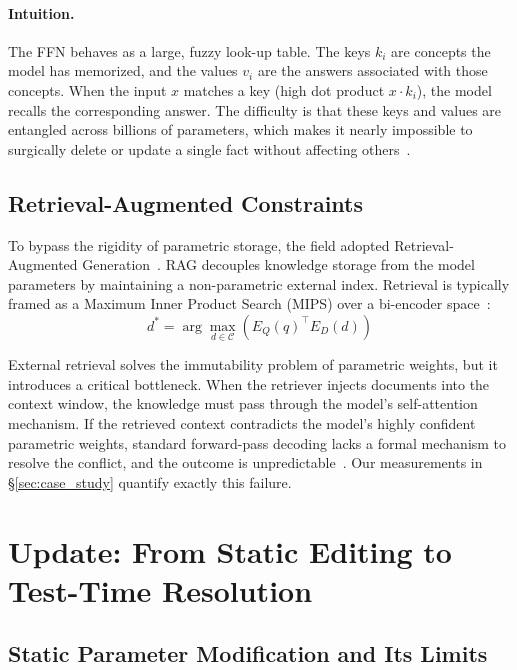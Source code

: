 \documentclass{article}
\begin{document}
\paragraph{Intuition.} The FFN behaves as a large, fuzzy look-up table. The keys $k_i$ are concepts the model has memorized, and the values $v_i$ are the answers associated with those concepts. When the input $x$ matches a key (high dot product $x \cdot k_i$), the model recalls the corresponding answer. The difficulty is that these keys and values are entangled across billions of parameters, which makes it nearly impossible to surgically delete or update a single fact without affecting others~\citep{yao2023editingsurvey}.

\subsection{Retrieval-Augmented Constraints}

To bypass the rigidity of parametric storage, the field adopted Retrieval-Augmented Generation~\citep{lewis2020rag}. RAG decouples knowledge storage from the model parameters by maintaining a non-parametric external index. Retrieval is typically framed as a Maximum Inner Product Search (MIPS) over a bi-encoder space~\citep{karpukhin2020dpr}:
\begin{equation}
  d^* = \arg\max_{d \in \mathcal{C}} \left( E_Q(q)^\top E_D(d) \right)
\end{equation}

External retrieval solves the immutability problem of parametric weights, but it introduces a critical bottleneck. When the retriever injects documents into the context window, the knowledge must pass through the model's self-attention mechanism. If the retrieved context contradicts the model's highly confident parametric weights, standard forward-pass decoding lacks a formal mechanism to resolve the conflict, and the outcome is unpredictable~\citep{xie2024conflicts, longpre2021entity}. Our measurements in \S\ref{sec:case_study} quantify exactly this failure.

\section{Update: From Static Editing to Test-Time Resolution}
\label{sec:update}

\subsection{Static Parameter Modification and Its Limits}
\end{document}
